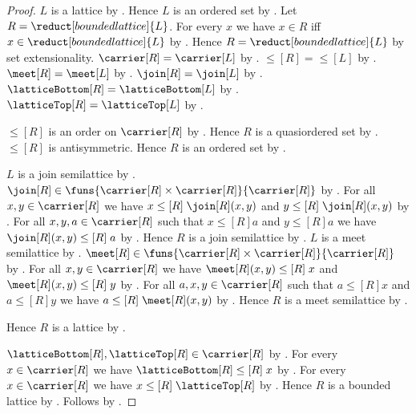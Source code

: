 \begin{proof}
    $L$ is a lattice by .
    Hence $L$ is an ordered set by .
    Let $R=\reduct[bounded lattice]{L}$.
    For every $x$ we have $x\in R$ iff
        $x\in\reduct[bounded lattice]{L}$ by \auto.
    Hence $R=\reduct[bounded lattice]{L}$ by set extensionality.
    $\carrier[R]=\carrier[L]$ by
        .
    $\leq[R]=\leq[L]$ by
        .
    $\meet[R]=\meet[L]$ by
        .
    $\join[R]=\join[L]$ by
        .
    $\latticeBottom[R]=\latticeBottom[L]$ by
        .
    $\latticeTop[R]=\latticeTop[L]$ by
        .

    $\leq[R]$ is an order on $\carrier[R]$ by
        .
    Hence $R$ is a quasiordered set by
        .
    $\leq[R]$ is antisymmetric.
    Hence $R$ is an ordered set by
        .

    $L$ is a join semilattice by
        .
    $\join[R]\in\funs{\carrier[R]\times\carrier[R]}{\carrier[R]}$ by
        .
    For all $x,y\in\carrier[R]$ we have
        $x\mathrel{\leq[R]}\join[R](x,y)$ and
        $y\mathrel{\leq[R]}\join[R](x,y)$ by
        .
    For all $x,y,a\in\carrier[R]$ such that
        $x\mathrel{\leq[R]}a$ and $y\mathrel{\leq[R]}a$ we have
        $\join[R](x,y)\mathrel{\leq[R]}a$ by
        .
    Hence $R$ is a join semilattice by
        .
    $L$ is a meet semilattice by
        .
    $\meet[R]\in\funs{\carrier[R]\times\carrier[R]}{\carrier[R]}$ by
        .
    For all $x,y\in\carrier[R]$ we have
        $\meet[R](x,y)\mathrel{\leq[R]}x$ and
        $\meet[R](x,y)\mathrel{\leq[R]}y$ by
        .
    For all $a,x,y\in\carrier[R]$ such that
        $a\mathrel{\leq[R]}x$ and $a\mathrel{\leq[R]}y$ we have
        $a\mathrel{\leq[R]}\meet[R](x,y)$ by
        .
    Hence $R$ is a meet semilattice by
        .

    Hence $R$ is a lattice by
        .

    $\latticeBottom[R],\latticeTop[R]\in\carrier[R]$ by
        .
    For every $x\in\carrier[R]$ we have
        $\latticeBottom[R]\mathrel{\leq[R]}x$ by
        .
    For every $x\in\carrier[R]$ we have
        $x\mathrel{\leq[R]}\latticeTop[R]$ by
        .
    Hence $R$ is a bounded lattice by
        .
    Follows by
        .
\end{proof}
